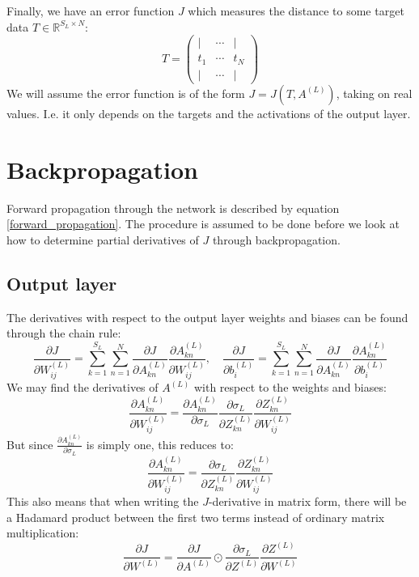 \documentclass[12pt, a4paper]{article}
\numberwithin{equation}{section}
\begin{document}
Finally, we have an error function $J$ which measures the distance to some target data $T\in\mathbb{R}^{S_L\times N}$:
\begin{equation}
T=
\begin{pmatrix}
| & \cdots & | \\
t_1 & \cdots & t_N \\
| & \cdots & |
\end{pmatrix}
\end{equation}
We will assume the error function is of the form $J=J(T,A^{(L)})$, taking on real values. I.e. it only depends on the targets and the activations of the output layer.

\section{Backpropagation}
Forward propagation through the network is described by equation \ref{forward_propagation}. The procedure is assumed to be done before we look at how to determine partial derivatives of $J$ through backpropagation.

\subsection{Output layer}
The derivatives with respect to the output layer weights and biases can be found through the chain rule:
\begin{equation}
\label{output_grad}
\frac{\partial J}{\partial W^{(L)}_{ij}}=\sum_{k=1}^{S_L}\sum_{n=1}^N\frac{\partial J}{\partial A^{(L)}_{kn}}\frac{\partial A^{(L)}_{kn}}{\partial W^{(L)}_{ij}},\quad\frac{\partial J}{\partial b^{(L)}_i}=\sum_{k=1}^{S_L}\sum_{n=1}^N\frac{\partial J}{\partial A^{(L)}_{kn}}\frac{\partial A^{(L)}_{kn}}{\partial b^{(L)}_i}
\end{equation}
We may find the derivatives of $A^{(L)}$ with respect to the weights and biases:
\begin{equation}
\frac{\partial A^{(L)}_{kn}}{\partial W^{(L)}_{ij}}=\frac{\partial A^{(L)}_{kn}}{\partial\sigma_L}\frac{\partial\sigma_L}{\partial Z^{(L)}_{kn}}\frac{\partial Z^{(L)}_{kn}}{\partial W^{(L)}_{ij}}
\end{equation}
But since $\frac{\partial A^{(L)}_{kn}}{\partial\sigma_L}$ is simply one, this reduces to:
\begin{equation}
\label{output_a_grad}
\frac{\partial A^{(L)}_{kn}}{\partial W^{(L)}_{ij}}=\frac{\partial\sigma_L}{\partial Z^{(L)}_{kn}}\frac{\partial Z^{(L)}_{kn}}{\partial W^{(L)}_{ij}}
\end{equation}
This also means that when writing the $J$-derivative in matrix form, there will be a Hadamard product between the first two terms instead of ordinary matrix multiplication:
\begin{equation}
\label{hadamard_diff}
\frac{\partial J}{\partial W^{(L)}}=\frac{\partial J}{\partial A^{(L)}}\odot\frac{\partial\sigma_L}{\partial Z^{(L)}}\frac{\partial Z^{(L)}}{\partial W^{(L)}}
\end{equation}
\end{document}
